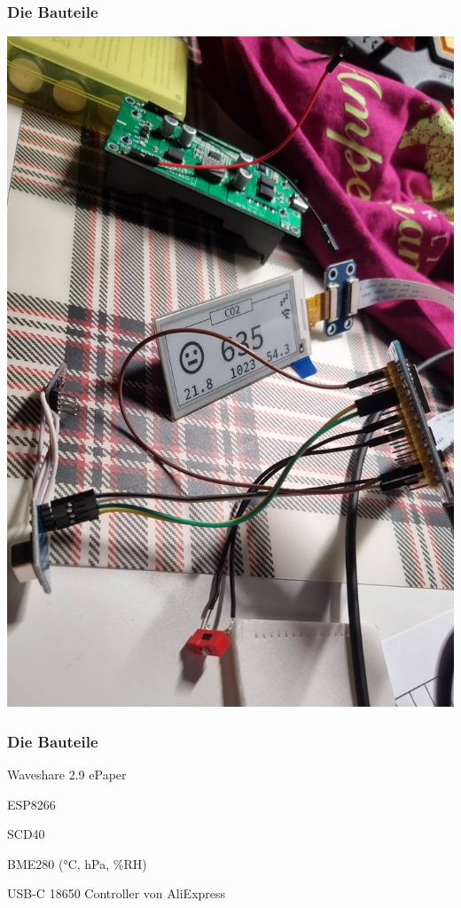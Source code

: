 \documentclass[aspectratio=169,svgnames]{beamer}
\begin{document}
\begin{frame}%
    \frametitle{Die Bauteile} %
    \centering
    \includegraphics[width=0.9\textheight,angle=90]{bauteile-01.jpg}
\end{frame}

\begin{frame}%
    \frametitle{Die Bauteile} %
    \begin{description}[<+->][labelwidth=20en]
       \item[Display] Waveshare \SI{2.9}{\inch} ePaper
       \item[Mikrocontroller] ESP8266
       \item[CO2 Sensor] SCD40
       \item[Zusatzsensor] BME280 (\si{\celsius}, \si{\hecto\pascal}, \%RH)
       \item[Akkucontroller] USB-C 18650 Controller von AliExpress
    \end{description}
\end{frame}
\end{document}
